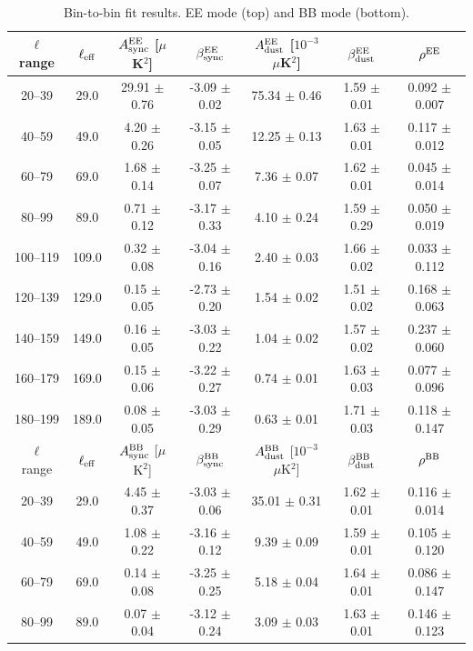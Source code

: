 \begin{table}[htbp]
\centering
\caption{Bin-to-bin fit results. EE mode (top) and BB mode (bottom).}
\label{tab:bin_to_bin_results}
\begin{tabular}{c c c c c c c}
\hline\hline
$\ell$ range & $\ell_{\rm eff}$ & $A^{\rm EE}_{\rm sync}$ [$\mu$K$^2$] & $\beta^{\rm EE}_{\rm sync}$ & $A^{\rm EE}_{\rm dust}$ [$10^{-3}$ $\mu$K$^2$] & $\beta^{\rm EE}_{\rm dust}$ & $\rho^{\rm EE}$ \\
\hline
20--39 & 29.0 & 29.91 $\pm$ 0.76 & -3.09 $\pm$ 0.02 & 75.34 $\pm$ 0.46 & 1.59 $\pm$ 0.01 & 0.092 $\pm$ 0.007 \\
40--59 & 49.0 & 4.20 $\pm$ 0.26 & -3.15 $\pm$ 0.05 & 12.25 $\pm$ 0.13 & 1.63 $\pm$ 0.01 & 0.117 $\pm$ 0.012 \\
60--79 & 69.0 & 1.68 $\pm$ 0.14 & -3.25 $\pm$ 0.07 & 7.36 $\pm$ 0.07 & 1.62 $\pm$ 0.01 & 0.045 $\pm$ 0.014 \\
80--99 & 89.0 & 0.71 $\pm$ 0.12 & -3.17 $\pm$ 0.33 & 4.10 $\pm$ 0.24 & 1.59 $\pm$ 0.29 & 0.050 $\pm$ 0.019 \\
100--119 & 109.0 & 0.32 $\pm$ 0.08 & -3.04 $\pm$ 0.16 & 2.40 $\pm$ 0.03 & 1.66 $\pm$ 0.02 & 0.033 $\pm$ 0.112 \\
120--139 & 129.0 & 0.15 $\pm$ 0.05 & -2.73 $\pm$ 0.20 & 1.54 $\pm$ 0.02 & 1.51 $\pm$ 0.02 & 0.168 $\pm$ 0.063 \\
140--159 & 149.0 & 0.16 $\pm$ 0.05 & -3.03 $\pm$ 0.22 & 1.04 $\pm$ 0.02 & 1.57 $\pm$ 0.02 & 0.237 $\pm$ 0.060 \\
160--179 & 169.0 & 0.15 $\pm$ 0.06 & -3.22 $\pm$ 0.27 & 0.74 $\pm$ 0.01 & 1.63 $\pm$ 0.03 & 0.077 $\pm$ 0.096 \\
180--199 & 189.0 & 0.08 $\pm$ 0.05 & -3.03 $\pm$ 0.29 & 0.63 $\pm$ 0.01 & 1.71 $\pm$ 0.03 & 0.118 $\pm$ 0.147 \\
\hline
$\ell$ range & $\ell_{\rm eff}$ & $A^{\rm BB}_{\rm sync}$ [$\mu$K$^2$] & $\beta^{\rm BB}_{\rm sync}$ & $A^{\rm BB}_{\rm dust}$ [$10^{-3}$ $\mu$K$^2$] & $\beta^{\rm BB}_{\rm dust}$ & $\rho^{\rm BB}$ \\
\hline
20--39 & 29.0 & 4.45 $\pm$ 0.37 & -3.03 $\pm$ 0.06 & 35.01 $\pm$ 0.31 & 1.62 $\pm$ 0.01 & 0.116 $\pm$ 0.014 \\
40--59 & 49.0 & 1.08 $\pm$ 0.22 & -3.16 $\pm$ 0.12 & 9.39 $\pm$ 0.09 & 1.59 $\pm$ 0.01 & 0.105 $\pm$ 0.120 \\
60--79 & 69.0 & 0.14 $\pm$ 0.08 & -3.25 $\pm$ 0.25 & 5.18 $\pm$ 0.04 & 1.64 $\pm$ 0.01 & 0.086 $\pm$ 0.147 \\
80--99 & 89.0 & 0.07 $\pm$ 0.04 & -3.12 $\pm$ 0.24 & 3.09 $\pm$ 0.03 & 1.63 $\pm$ 0.01 & 0.146 $\pm$ 0.123 \\

\end{tabular}
\end{table}
